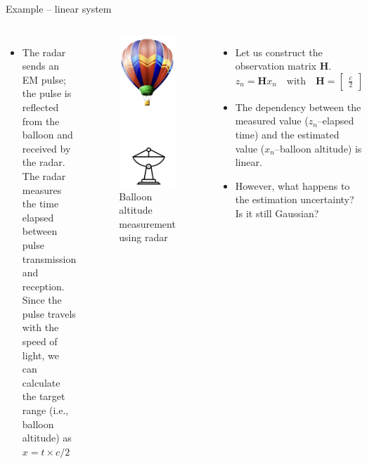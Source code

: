 \begin{frame}{Example – linear system}
\begin{columns}
\begin{itemize}
\item The radar sends an EM pulse; the pulse is reflected from the balloon and received by the radar. The radar measures the time elapsed
between pulse transmission and reception. Since the pulse travels with the speed of light, we can calculate the target range (i.e., balloon altitude) as $x = t\times{c}/{2}$
\end{itemize}
        \begin{figure}
            \centering
            \includegraphics[width=0.2\linewidth]{Figures//Background3/Ballon_LinearSystem.png}
            \caption{Balloon altitude measurement using radar}
        \end{figure}
    \begin{itemize}
        \item Let us construct the observation matrix $\mathbf{H}$.
        \[
        z_n = \mathbf{H} x_n \quad \text{with} \quad \mathbf{H} = \begin{bmatrix} \frac{c}{2} \end{bmatrix} 
        \]
        \item The dependency between the measured value ($z_n$--elapsed time) and the estimated value
        ($x_n$--balloon altitude) is linear.

        \item However, what happens to the estimation uncertainty? Is it still Gaussian?

    \end{itemize}
        
\end{columns}
\end{frame}
